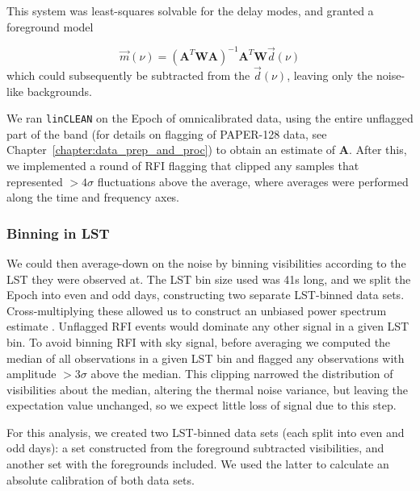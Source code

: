 This system was least-squares solvable for the delay modes, and granted a foreground model

\begin{equation}
\vec{m}(\nu) = (\textbf{A}^T \textbf{W} \textbf{A})^{-1}\textbf{A}^T\textbf{W}\vec{d}(\nu)
\end{equation}
which could subsequently be subtracted from the $\vec{d}(\nu)$, leaving only the noise-like backgrounds.

We ran {\tt linCLEAN} on the Epoch of {\sc omnical}ibrated data, using the entire unflagged part of the band (for details on flagging of PAPER-128 data, see Chapter~\ref{chapter:data_prep_and_proc}) to obtain an estimate of $\textbf{A}$.
After this, we implemented a round of RFI flagging that clipped any samples that represented $>4\sigma$ fluctuations above the average, where averages were performed along the time and frequency axes.

\subsubsection{Binning in LST}

We could then average-down on the noise by binning visibilities according to the LST they were observed at. The LST bin size used was 41s long, and we split the Epoch into even and odd days, constructing two separate LST-binned data sets. Cross-multiplying these allowed us to construct an unbiased power spectrum estimate \citep[e.g.][Cheng et al., \textit{submitted}]{Parsons.14}.
Unflagged RFI events would dominate any other signal in a given LST bin. To avoid binning RFI with sky signal, before averaging we computed the median of all observations in a given LST bin and flagged any observations with amplitude $>3\sigma$ above the median. This clipping narrowed the distribution of visibilities about the median, altering the thermal noise variance, but leaving the expectation value unchanged, so we expect little loss of signal due to this step.

For this analysis, we created two LST-binned data sets (each split into even and odd days): a set constructed from the foreground subtracted visibilities, and another set with the foregrounds included. We used the latter to calculate an absolute calibration of both data sets.

